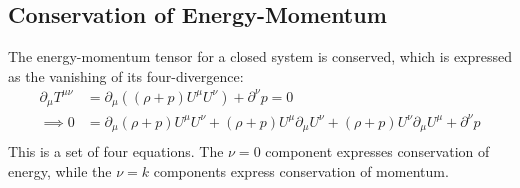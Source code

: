 \documentclass[11pt, a4paper]{report}
\begin{document}
\subsection*{Conservation of Energy-Momentum}

The energy-momentum tensor for a closed system is conserved, which is expressed as the vanishing of its four-divergence:
\begin{equation}\label{eq:cons-T}
\begin{split}
    \partial_\mu T^{\mu\nu} &= \partial_\mu \left( (\rho + p) U^\mu U^\nu \right) + \partial^\nu p = 0 \\
    \implies 0 &= \partial_\mu (\rho + p) U^\mu U^\nu + (\rho + p) U^\mu \partial_\mu U^\nu + (\rho + p)  U^\nu \partial_\mu U^\mu+ \partial^\nu p\\
\end{split}
\end{equation}
This is a set of four equations. The $\nu=0$ component expresses conservation of energy, while the $\nu=k$ components express conservation of momentum.
\end{document}

